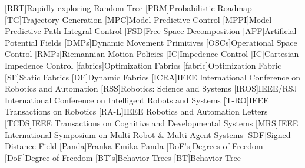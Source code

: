 [RRT]{Rapidly-exploring Random Tree}
[PRM]{Probabilistic Roadmap}
[TG]{Trajectory Generation}
[MPC]{Model Predictive Control}
[MPPI]{Model Predictive Path Integral Control}
[FSD]{Free Space Decomposition}
[APF]{Artificial Potential Fields}
[DMPs]{Dynamic Movement Primitives}
[OSCs]{Operational Space Control}
[RMPs]{Riemannian Motion Policies}
[IC]{Impedence Control}
[IC]{Cartesian Impedence Control}
[fabrics]{Optimization Fabrics}
[fabric]{Optimization Fabric}
[SF]{Static Fabrics}
[DF]{Dynamic Fabrics}
[ICRA]{IEEE International Conference on Robotics and Automation}
[RSS]{Robotics: Science and Systems}
[IROS]{IEEE/RSJ International Conference on Intelligent Robots and Systems}
[T-RO]{IEEE Transactions on Robotics}
[RA-L]{IEEE Robotics and Automation Letters}
[TCDS]{IEEE Transactions on Cognitive and Developmental Systems}
[MRS]{IEEE International Symposium on Multi-Robot \& Multi-Agent Systems}
[SDF]{Signed Distance Field}
[Panda]{Franka Emika Panda}
[DoF's]{Degrees of Freedom}
[DoF]{Degree of Freedom}
[BT's]{Behavior Trees}
[BT]{Behavior Tree}


\newcommand{\tn}[1]{\textnormal{#1}}
\newcommand{\tb}[1]{\textbf{#1}}
\newcommand{\ti}[1]{\textit{#1}}
\newcommand{\va}{\mathbf{a}}
\newcommand{\vb}{\mathbf{b}}
\newcommand{\vc}{\mathbf{c}}
\newcommand{\vd}{\mathbf{d}}
\newcommand{\ve}{\mathbf{e}}
\newcommand{\vf}{\mathbf{f}}
\newcommand{\vg}{\mathbf{g}}
\newcommand{\vh}{\mathbf{h}}
\newcommand{\vl}{\mathbf{l}}
\newcommand{\vm}{\mathbf{m}}
\newcommand{\vn}{\mathbf{n}}
\newcommand{\vp}{\mathbf{p}}
\newcommand{\vq}{\mathbf{q}}
\newcommand{\vr}{\mathbf{r}}
\newcommand{\vs}{\mathbf{s}}
\newcommand{\vS}{\mathbf{S}}
\newcommand{\vo}{\mathbf{o}}
\newcommand{\vt}{\mathbf{t}}
\newcommand{\vu}{\mathbf{u}}
\newcommand{\vv}{\mathbf{v}}
\newcommand{\vw}{\mathbf{w}}
\newcommand{\vx}{\mathbf{x}}
\newcommand{\vX}{\mathbf{X}}
\newcommand{\vy}{\mathbf{y}}
\newcommand{\vz}{\mathbf{z}}
\newcommand{\cA}{\mathcal{A}}
\newcommand{\cB}{\mathcal{B}}
\newcommand{\cC}{\mathcal{C}}
\newcommand{\cD}{\mathcal{D}}
\newcommand{\cE}{\mathcal{E}}
\newcommand{\cF}{\mathcal{F}}
\newcommand{\cG}{\mathcal{G}}
\newcommand{\cH}{\mathcal{H}}
\newcommand{\cI}{\mathcal{I}}
\newcommand{\cJ}{\mathcal{J}}
\newcommand{\cK}{\mathcal{K}}
\newcommand{\cL}{\mathcal{L}}
\newcommand{\cM}{\mathcal{M}}
\newcommand{\cN}{\mathcal{N}}
\newcommand{\cO}{\mathcal{O}}
\newcommand{\cP}{\mathcal{P}}
\newcommand{\cQ}{\mathcal{Q}}
\newcommand{\cR}{\mathcal{R}}
\newcommand{\cS}{\mathcal{S}}
\newcommand{\cT}{\mathcal{T}}
\newcommand{\cU}{\mathcal{U}}
\newcommand{\cV}{\mathcal{V}}
\newcommand{\cW}{\mathcal{W}}
\newcommand{\cX}{\mathcal{X}}
\newcommand{\cY}{\mathcal{Y}}
\newcommand{\cZ}{\mathcal{Z}}

